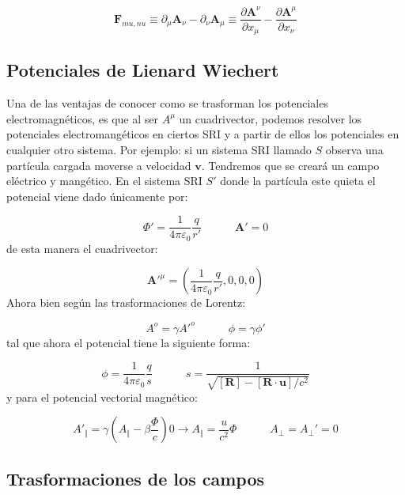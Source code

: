 \documentclass[12pt,a4paper]{article}
\newcommand{\parentesis}[1]{\left( #1  \right)}
\newcommand{\parciales}[2]{\frac{\partial #1}{\partial #2}}
\newcommand{\tquad}{\quad \quad \quad}
\newcommand{\Fn}{\mathbf{F}}
\newcommand{\vn}{\mathbf{v}}
\newcommand{\An}{\mathbf{A}}
\newcommand{\un}{\mathbf{u}}
\newcommand{\Rn}{\mathbf{R}}
\numberwithin{equation}{section}
\numberwithin{figure}{section}
\begin{document}
\begin{equation}
\Fn_{mu,nu} \equiv \partial_\mu \An_\nu - \partial_\nu \An_\mu \equiv \parciales{\An^\nu}{x_\mu} - \parciales{\An^\mu}{x_\nu}
\end{equation}


\subsection{Potenciales de Lienard Wiechert}

Una de las ventajas de conocer como se trasforman los potenciales electromagnéticos, es que al ser $A^\mu$ un cuadrivector, podemos resolver los potenciales electromangéticos en ciertos SRI y a partir de ellos los potenciales en cualquier otro sistema. Por ejemplo: si un sistema SRI llamado $S$ observa una partícula cargada moverse a velocidad $\vn$. Tendremos que se creará un campo eléctrico y mangético. En el sistema SRI $S'$ donde la partícula este quieta el potencial viene dado únicamente por:

\begin{equation}
\Phi' = \dfrac{1}{4 \pi \varepsilon_0} \dfrac{q}{r'} \tquad \An' = 0
\end{equation}
de esta manera el cuadrivector:

\begin{equation}
\An'^\mu = \parentesis{\dfrac{1}{4 \pi \varepsilon_0} \dfrac{q}{r'}, 0,0,0}
\end{equation}
Ahora bien según las trasformaciones de Lorentz:

\begin{equation}
A^o = \gamma A'^o \tquad \phi = \gamma \phi'
\end{equation}
tal que ahora el potencial tiene la siguiente forma:

\begin{equation}
\phi = \dfrac{1}{4 \pi \varepsilon_0} \dfrac{q}{s} \tquad s = \dfrac{1}{\sqrt{[\Rn] - [\Rn \cdot \un]/c^2}}
\end{equation}
y para el potencial vectorial magnético:

\begin{equation}
A'_\Vert = \gamma \parentesis{A_\Vert - \beta \dfrac{\Phi}{c}} 0 \rightarrow A_\Vert = \dfrac{u}{c^2} \Phi \tquad A_\perp = A_\perp ' = 0
\end{equation}

\subsection{Trasformaciones de los campos}
\end{document}
